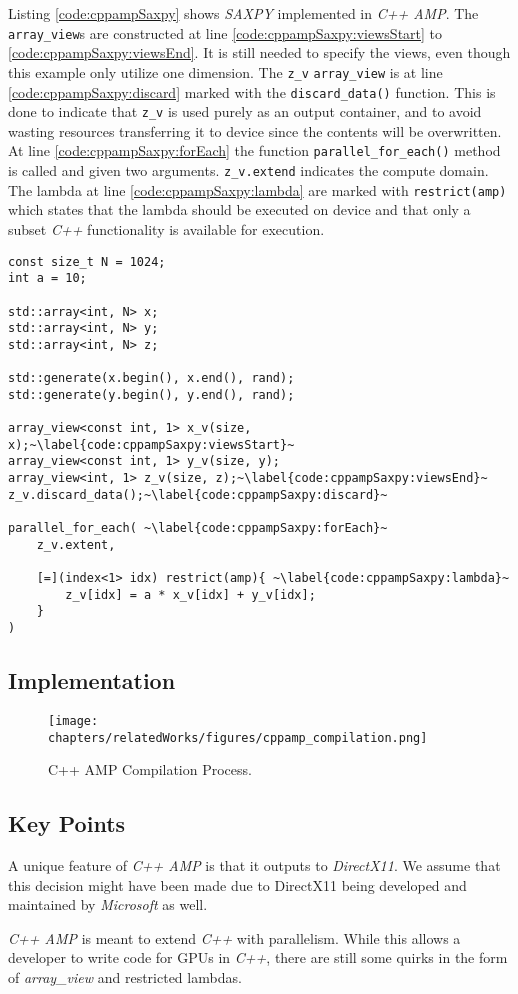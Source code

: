 Listing \ref{code:cppampSaxpy} shows \textit{SAXPY} implemented in \textit{C++ AMP}. The \texttt{array\_view}s are constructed at line \ref{code:cppampSaxpy:viewsStart} to \ref{code:cppampSaxpy:viewsEnd}. It is still needed to specify the views, even though this example only utilize one dimension. The \texttt{z\_v} \texttt{array\_view} is at line \ref{code:cppampSaxpy:discard} marked with the \texttt{discard\_data()} function. This is done to indicate that \texttt{z\_v} is used purely as an output container, and to avoid wasting resources transferring it to device since the contents will be overwritten.
At line \ref{code:cppampSaxpy:forEach} the function \texttt{parallel\_for\_each()} method is called and given two arguments. \texttt{z\_v.extend} indicates the compute domain. The lambda at line \ref{code:cppampSaxpy:lambda} are marked with \texttt{restrict(amp)} which states that the lambda should be executed on device and that only a subset \textit{C++} functionality is available for execution.
\begin{lstlisting}[caption={\textit{C++ AMP} \textit{SAXPY} example.}, label={code:cppampSaxpy}]
const size_t N = 1024;
int a = 10;

std::array<int, N> x;
std::array<int, N> y;
std::array<int, N> z;

std::generate(x.begin(), x.end(), rand);
std::generate(y.begin(), y.end(), rand);

array_view<const int, 1> x_v(size, x);~\label{code:cppampSaxpy:viewsStart}~
array_view<const int, 1> y_v(size, y);
array_view<int, 1> z_v(size, z);~\label{code:cppampSaxpy:viewsEnd}~
z_v.discard_data();~\label{code:cppampSaxpy:discard}~

parallel_for_each( ~\label{code:cppampSaxpy:forEach}~
    z_v.extent,

    [=](index<1> idx) restrict(amp){ ~\label{code:cppampSaxpy:lambda}~
        z_v[idx] = a * x_v[idx] + y_v[idx];
    }
)
\end{lstlisting}

\subsection{Implementation}
\begin{figure}[H]
\center
\texttt{[image: chapters/relatedWorks/figures/cppamp\_compilation.png]}
\caption{C++ AMP Compilation Process.}
\label{fig:cppampCompilation}
\end{figure}

\subsection{Key Points}
A unique feature of \textit{C++ AMP} is that it outputs to \textit{DirectX11}. We assume that this decision might have been made due to DirectX11 being developed and maintained by \textit{Microsoft} as well.

\textit{C++ AMP} is meant to extend \textit{C++} with parallelism. While this allows a developer to write code for GPUs in \textit{C++}, there are still some quirks in the form of \textit{array\_view} and restricted lambdas.
